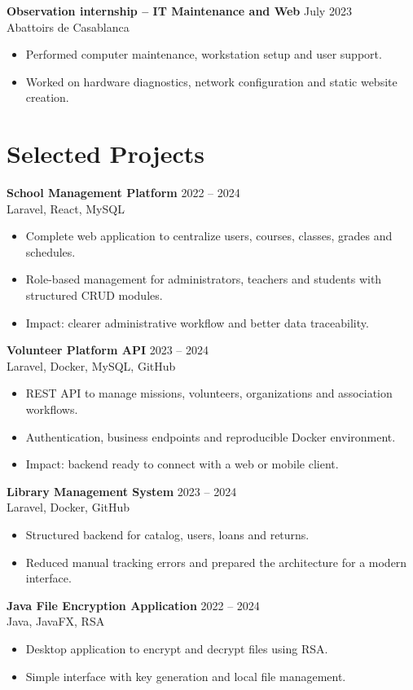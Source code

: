\documentclass[10pt,a4paper]{article}
\newcommand{\entry}[4]{
  \textbf{#1} \hfill {\small\color{muted} #2}\\
  {\color{accent}#3}\\[-2pt]
  #4
}
\begin{document}
\entry{Observation internship -- IT Maintenance and Web}{July 2023}{Abattoirs de Casablanca}{
\begin{itemize}
  \item Performed computer maintenance, workstation setup and user support.
  \item Worked on hardware diagnostics, network configuration and static website creation.
\end{itemize}
}

\section*{Selected Projects}
\entry{School Management Platform}{2022 -- 2024}{Laravel, React, MySQL}{
\begin{itemize}
  \item Complete web application to centralize users, courses, classes, grades and schedules.
  \item Role-based management for administrators, teachers and students with structured CRUD modules.
  \item Impact: clearer administrative workflow and better data traceability.
\end{itemize}
}

\entry{Volunteer Platform API}{2023 -- 2024}{Laravel, Docker, MySQL, GitHub}{
\begin{itemize}
  \item REST API to manage missions, volunteers, organizations and association workflows.
  \item Authentication, business endpoints and reproducible Docker environment.
  \item Impact: backend ready to connect with a web or mobile client.
\end{itemize}
}

\entry{Library Management System}{2023 -- 2024}{Laravel, Docker, GitHub}{
\begin{itemize}
  \item Structured backend for catalog, users, loans and returns.
  \item Reduced manual tracking errors and prepared the architecture for a modern interface.
\end{itemize}
}

\entry{Java File Encryption Application}{2022 -- 2024}{Java, JavaFX, RSA}{
\begin{itemize}
  \item Desktop application to encrypt and decrypt files using RSA.
  \item Simple interface with key generation and local file management.
\end{itemize}
}
\end{document}
